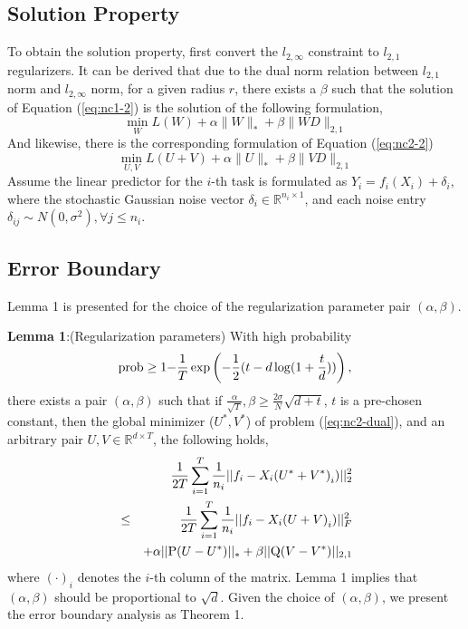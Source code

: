 \documentclass{article}
\newcounter{lem_counter}
\newcounter{pro_counter}
\begin{document}
\subsection{Solution Property}

To obtain the solution property, first  convert
the $l_{2,\infty}$ constraint to $l_{2,1}$ regularizers. 
It can be derived that due to the dual norm relation between $l_{2,1}$ norm and $l_{2,\infty}$ norm, for a given radius $r$, there exists a $\beta$
such that the solution of Equation (\ref{eq:nc1-2}) is the solution
of the following formulation,
%
\begin{equation}
\mathop {\min }\limits_W L(W)+\alpha\|W\|_{*}+\beta\|WD\|_{2,1}
\label{eq:nc1-dual}
\end{equation}
And likewise, there is the corresponding formulation of Equation (\ref{eq:nc2-2}) 
%
\begin{equation}
\mathop {\min }\limits_{U,V} L(U+V) +\alpha\|U\|_{*}+\beta\|VD\|_{2,1}
\label{eq:nc2-dual}
\end{equation}
%
Assume the linear predictor for the $i$-th task is formulated as
$
{Y_i} = {f_i}({X_i}) + {\delta _i},
$
where  the stochastic Gaussian noise vector ${\delta _i} \in {\mathbb{R}^{{n_i \times 1}}}$, and each noise entry ${\delta _{ij}} \sim N(0,{\sigma ^2}),\forall j \le {n_i}$. 

\subsection{Error Boundary}

Lemma 1 is presented for the choice of the regularization parameter pair $(\alpha, \beta)$.

\noindent \textbf{Lemma 1}:(Regularization parameters) With high probability
\begin{equation}
{\rm {prob}}\ge{\rm {1-}}\frac{1}{T}\exp\left({-\frac{1}{2}(t-d\log(1+\frac{t}{d}))}\right),
\end{equation}
%
there exists a pair $(\alpha, \beta)$ such that if $\frac{\alpha }{{\sqrt T }},\beta  \ge \frac{{2\sigma }}{N}\sqrt {d + t} $, $t$ is a pre-chosen constant, then the global minimizer ($U^*, V^*$) of problem (\ref{eq:nc2-dual}), and an arbitrary pair $U,V \in {\mathbb{R}^{d \times T}}$, the following holds,
%
\begin{eqnarray}
&& \frac{1}{{2T}}\sum\limits_{i = 1}^T {\frac{1}{{{n_i}}}||{f_i} - {X_i}{{(U^* + V^*)}_i})||_2^2} \\
\nonumber
&\le & \frac{1}{{2T}}\sum\limits_{i = 1}^T {\frac{1}{{{n_i}}}||{f_i} - {X_i}{{(U + V)}_i})||_F^2} \\
\nonumber
&& { + \alpha ||{\rm P}(U - U^*)|{|_*} + \beta ||{\rm Q}(V - V^*)|{|_{2,1}}}
\end{eqnarray}
%
where $(\cdot)_{i}$ denotes the $i$-th column of the matrix. Lemma 1 implies that $(\alpha, \beta)$ should be proportional to $\sqrt{d}$. Given the choice of $(\alpha, \beta)$, we present the error boundary analysis as Theorem 1.
\end{document}
